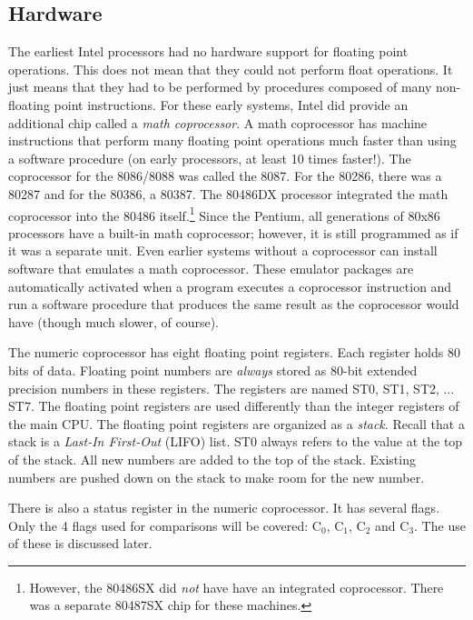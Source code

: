 {\subsection{Hardware}
The earliest Intel processors had no hardware support for floating
point operations. This does not mean that they could not perform float
operations.  It just means that they had to be performed by procedures
composed of many non-floating point instructions. For these early
systems, Intel did provide an additional chip called a \emph{math
coprocessor}. A math coprocessor has machine instructions that perform
many floating point operations much faster than using a software
procedure (on early processors, at least 10 times faster!). The
coprocessor for the 8086/8088 was called the 8087. For the 80286,
there was a 80287 and for the 80386, a 80387. The 80486DX processor
integrated the math coprocessor into the 80486
itself.\footnote{However, the 80486SX did \emph{not} have have an
integrated coprocessor.  There was a separate 80487SX chip for these
machines.}  Since the Pentium, all generations of 80x86 processors
have a built-in math coprocessor; however, it is still programmed as if
it was a separate unit. Even earlier systems without a coprocessor can
install software that emulates a math coprocessor. These emulator
packages are automatically activated when a program executes a
coprocessor instruction and run a software procedure that produces the
same result as the coprocessor would have (though much slower, of
course).

The numeric coprocessor has eight floating point registers. Each
register holds 80 bits of data. Floating point numbers are
\emph{always} stored as 80-bit extended precision numbers in these
registers. The registers are named {\code ST0}, {\code ST1}, {\code
ST2}, $\ldots$ {\code ST7}.  The floating point registers are used
differently than the integer registers of the main CPU. The floating
point registers are organized as a \emph{stack}.  Recall that a stack
is a \emph{Last-In First-Out} (LIFO) list. {\code ST0} always refers
to the value at the top of the stack. All new numbers are added to the
top of the stack. Existing numbers are pushed down on the stack to
make room for the new number.

There is also a status register in the numeric coprocessor. It has several
flags. Only the 4 flags used for comparisons will be covered: C$_0$,
C$_1$, C$_2$ and C$_3$. The use of these is discussed later.

}
